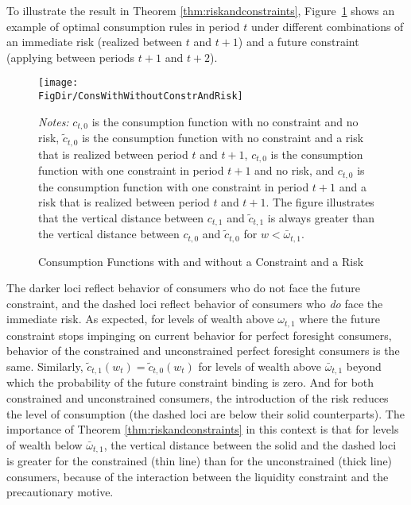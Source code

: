\documentclass[titlepage]{\econtex}
\providecommand{\wAlt}{\omega}
\begin{document}
To illustrate the result in Theorem \ref{thm:riskandconstraints}, Figure~\ref{fig:SolveConstrCompare4Cases} shows an example of optimal consumption rules in period $t$ under different combinations of an immediate risk (realized between $t$ and $t+1$) and a future constraint (applying between periods $t+1$ and $t+2$).%
\hypertarget{ConsWithWithoutConstrAndRisk}{}
\begin{figure}[ht]
	{\centering
\texttt{[image: \\FigDir/ConsWithWithoutConstrAndRisk]}}

\caption{Consumption Functions with and without a Constraint and a Risk}
{\footnotesize \begin{singlespace} {\emph{Notes:} $c_{t,0}$ is the consumption function with no constraint and no risk, $\tilde{c}_{t,0}$ is the consumption function with no constraint and a risk that is realized between period $t$ and $t+1$, $c_{t,0}$ is the consumption function with one constraint in period $t+1$ and no risk, and $c_{t,0}$ is the consumption function with one constraint in period $t+1$ and a risk that is realized between period $t$ and $t+1$. The figure illustrates that the vertical distance between $c_{t,1}$ and $\tilde{c}_{t,1}$ is always greater than the vertical distance between $c_{t,0}$ and $\tilde{c}_{t,0}$ for $w < \bar{\omega}_{t,1}$. }  \end{singlespace}}
\label{fig:SolveConstrCompare4Cases}
\end{figure}
The darker loci reflect behavior of consumers who do not face the
future constraint, and the dashed loci reflect behavior of consumers
who \textit{do} face the immediate risk.  As expected, for levels of
wealth above $\wAlt_{t,1}$ where the future constraint
stops impinging on current behavior for perfect foresight consumers,
behavior of the constrained and unconstrained perfect foresight
consumers is the same. Similarly, $\tilde{c}_{t,1}(w_{t}) =
\tilde{c}_{t,0}(w_{t})$ for levels of wealth above ${\bar{\wAlt}}_{t,1}$
beyond which the probability of the future constraint binding is zero.
And for both constrained and unconstrained consumers, the introduction
of the risk reduces the level of consumption (the dashed loci are
below their solid counterparts). The importance of Theorem \ref{thm:riskandconstraints} in this context is that for levels of wealth below ${\bar{\wAlt}}_{t,1}$, the vertical distance between the solid and the dashed loci is greater for the constrained (thin line) than for the unconstrained (thick line) consumers, because of the interaction between the liquidity constraint and the precautionary motive.
\end{document}
